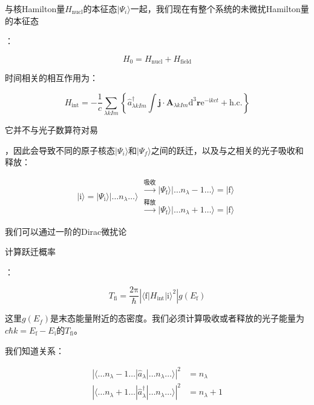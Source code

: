 与核Hamilton量$H_{\text{nucl}}$的本征态$|\Psi_{i}\rangle$一起，我们现在有整个系统的未微扰Hamilton量的本征态

：

\begin{equation}
H_{0}=H_{\text{nucl}}+H_{\text{field}}
\end{equation}

时间相关的相互作用为：

\begin{equation}
H_{\text{int}}=-\frac{1}{c}\sum_{\lambda kIm}\left\{ \hat{a}^{\dagger}_{\lambda kIm}\int\boldsymbol{j}\cdot\boldsymbol{A}_{\lambda kIm}\mathrm{d}^{3}\boldsymbol{r}\mathrm{e}^{-\mathrm{i}kct}+\text{h.c.}\right\} 
\end{equation}

它并不与光子数算符对易

，因此会导致不同的原子核态$|\Psi_{i}\rangle$和$|\Psi_{f}\rangle$之间的跃迁，以及与之相关的光子吸收和释放：

\[
|\text{i}\rangle=|\Psi_{\text{i}}\rangle|\dots n_{\lambda}\dots\rangle\begin{array}{c}
\xrightarrow{\text{吸收}}|\Psi_{\text{f}}\rangle|\dots n_{\lambda}-1\dots\rangle=|\text{f}\rangle\\
\xrightarrow{\text{释放}}|\Psi_{\text{f}}\rangle|\dots n_{\lambda}+1\dots\rangle=|\text{f}\rangle
\end{array}
\]

我们可以通过一阶的Dirac微扰论

计算跃迁概率

：

\begin{equation}
T_{\text{fi}}=\frac{2\mathrm{\pi}}{\hbar}\left|\langle\text{f}|H_{\text{int}}|\text{i}\rangle^{2}\right|g(E_{\text{f}})
\end{equation}

这里$g(E_{f})$是末态能量附近的态密度。我们必须计算吸收或者释放的光子能量为$c\hbar k=E_{\text{f}}-E_{\text{i}}$的$T_{\text{fi}}$。

我们知道关系：

\begin{align}
\left|\langle\dots n_{\lambda}-1\dots|\hat{a}_{\lambda}|\dots n_{\lambda}\dots\rangle\right|^{2} & =n_{\lambda}\\
\left|\langle\dots n_{\lambda}+1\dots|\hat{a}^{\dagger}_{\lambda}|\dots n_{\lambda}\dots\rangle\right|^{2} & =n_{\lambda}+1
\end{align}

